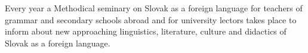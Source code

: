 Every year a Methodical seminary on Slovak as a foreign language for teachers of grammar and secondary schools abroad and for university lectors takes place to inform about new approaching linguistics, literature, culture and didactics of Slovak as a foreign language.
